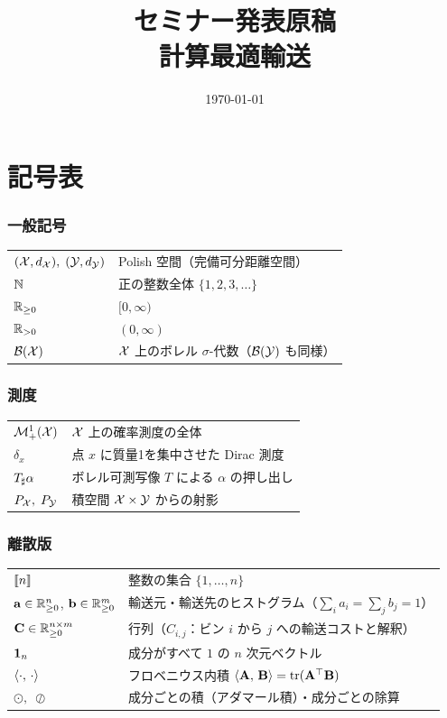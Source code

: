 \documentclass[uplatex, dvipdfmx]{jsreport}
\title{セミナー発表原稿\\{\Large 計算最適輸送}}
\author{}
\date{\today}
\begin{document}
\maketitle
\tableofcontents

\chapter*{記号表}

\subsection*{一般記号}
\begin{tabular}{ll}
  $(\mathcal{X}, d_{\mathcal{X}}),\; (\mathcal{Y}, d_{\mathcal{Y}})$ & Polish 空間（完備可分距離空間） \\
  $\mathbb{N}$ & 正の整数全体 $\{1, 2, 3, \ldots\}$ \\
  $\mathbb{R}_{\geq 0}$ & $[0,\infty)$ \\
  $\mathbb{R}_{>0}$ & $(0,\infty)$ \\
  $\mathcal{B}(\mathcal{X})$ & $\mathcal{X}$ 上のボレル $\sigma$-代数（$\mathcal{B}(\mathcal{Y})$ も同様） \\
\end{tabular}

\subsection*{測度}
\begin{tabular}{ll}
  $\mathcal{M}_+^1(\mathcal{X})$ & $\mathcal{X}$ 上の確率測度の全体 \\
  $\delta_x$ & 点 $x$ に質量1を集中させた Dirac 測度 \\
  $T_\sharp \alpha$ & ボレル可測写像 $T$ による $\alpha$ の押し出し \\
  $P_{\mathcal{X}},\; P_{\mathcal{Y}}$ & 積空間 $\mathcal{X} \times \mathcal{Y}$ からの射影 \\
\end{tabular}

\subsection*{離散版}
\begin{tabular}{ll}
  $\llbracket n \rrbracket$ & 整数の集合 $\{1, \ldots, n\}$ \\
  $\mathbf{a} \in \mathbb{R}_{\geq 0}^n$, $\mathbf{b} \in \mathbb{R}_{\geq 0}^m$
    & 輸送元・輸送先のヒストグラム（$\sum_i a_i = \sum_j b_j = 1$） \\
  $\mathbf{C} \in \mathbb{R}_{\geq 0}^{n \times m}$ & 行列（$C_{i,j}$：ビン $i$ から $j$ への輸送コストと解釈） \\
  $\mathbf{1}_n$ & 成分がすべて $1$ の $n$ 次元ベクトル \\
  $\langle \cdot,\, \cdot \rangle$ & フロベニウス内積 $\langle \mathbf{A},\, \mathbf{B} \rangle = \operatorname{tr}(\mathbf{A}^\top \mathbf{B})$ \\
  $\odot,\; \oslash$ & 成分ごとの積（アダマール積）・成分ごとの除算 \\
\end{tabular}
\end{document}
